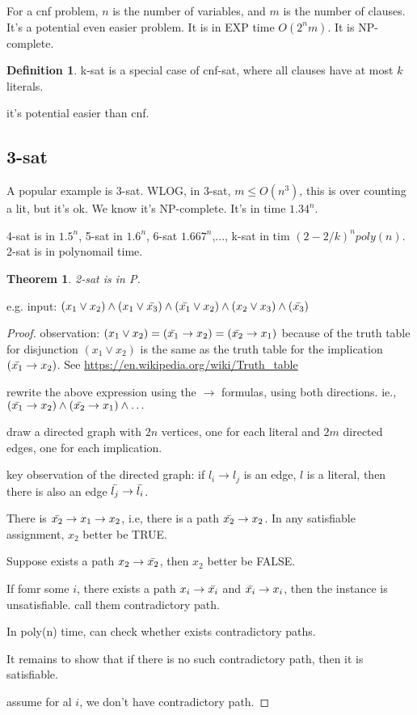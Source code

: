 \documentclass{article}
\theoremstyle{plain}
\newtheorem{theorem}{Theorem}[section]
\theoremstyle{definition}
\newtheorem{definition}{Definition}[section] %
\begin{document}
For a cnf problem, $n$ is the number of variables, and $m$ is the number of clauses. It's a potential even easier problem. It is in EXP time $O(2^nm)$. It is NP-complete. 

\begin{definition}
k-sat is a special case of cnf-sat, where all clauses have at most $k$ literals. 
\end{definition}
it's potential easier than cnf. 

\subsection{3-sat}

A popular example is 3-sat. WLOG, in 3-sat, $m \le O(n^3)$, this is over counting a lit, but it's ok. We know it's NP-complete. It's in time $1.34^n$.

4-sat is in $1.5^n$, 5-sat in $1.6^n$, 6-sat $1.667^n$,..., k-sat in tim $(2-2/k)^n poly(n)$. 2-sat is in polynomail time. 

\begin{theorem}
2-sat is in P. 
\end{theorem}

e.g. input: $(x_1\lor x_2)\land(x_1 \lor \Bar{x_3}) \land (\Bar{x_1} \lor x_2) \land (x_2 \lor x_3) \land (\Bar{x_3})$

\begin{proof}
observation: $(x_1 \lor x_2) = (\Bar{x_1} \rightarrow x_2) = (\Bar{x_2} \rightarrow x_1)$ because of the truth table for disjunction $(x_1 \lor x_2)$ is the same as the truth table for the implication $(\Bar{x_1} \rightarrow x_2)$. See  \url{https://en.wikipedia.org/wiki/Truth_table}

rewrite the above expression using the $\rightarrow$ formulas, using both directions. ie., $(\Bar{x_1} \rightarrow x_2) \land (\Bar{x_2} \rightarrow x_1) \land \dots$

draw a directed graph with $2n$ vertices, one for each literal and $2m$ directed edges, one for each implication. 

key observation of the directed graph: if $l_i \rightarrow l_j$ is an edge, $l$ is a literal, then there is also an edge $\Bar{l_j} \rightarrow \Bar{l_i}$. 

There is $\Bar{x_2} \rightarrow x_1 \rightarrow x_2$, i.e, there is a path $\Bar{x_2} \rightarrow x_2$. In any satisfiable assignment, $x_2$ better be TRUE. 

Suppose exists a path $x_2 \rightarrow \Bar{x_2}$, then $x_2$ better be FALSE. 

If fomr some $i$, there exists a path $x_i \rightarrow \Bar{x_i}$ and $\Bar{x_i} \rightarrow x_i$, then the instance is unsatisfiable. call them contradictory path. 

In poly(n) time, can check whether exists contradictory paths. 

It remains to show that if there is no such contradictory path,  then it is satisfiable. 

assume for al $i$, we don't have contradictory path. 
\end{proof}
\end{document}
